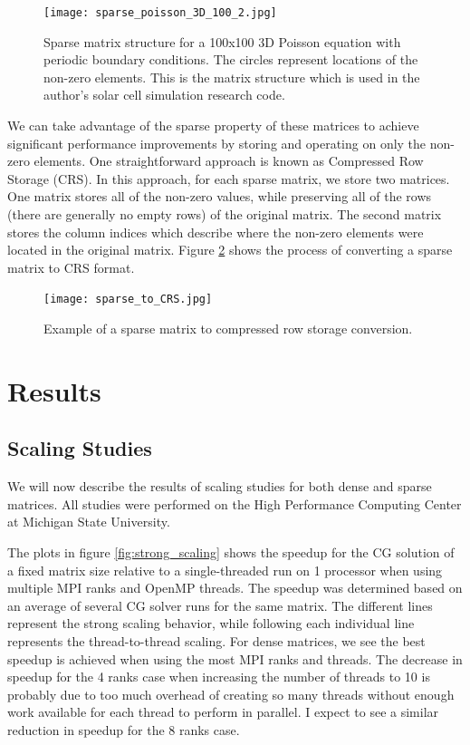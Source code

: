 \documentclass{article}
\begin{document}
\begin{figure}[H]
	\centering
	\texttt{[image: sparse\_poisson\_3D\_100\_2.jpg]}  
	
	\caption{Sparse matrix structure for a 100x100 3D Poisson equation with periodic boundary conditions. The circles represent locations of the non-zero elements. This is the matrix structure which is used in the author's solar cell simulation research code.}
	\label{fig:sparse_structure}
\end{figure}

We can take advantage of the sparse property of these matrices to achieve significant performance improvements by storing and operating on only the non-zero elements. One straightforward approach is known as Compressed Row Storage (CRS). In this approach, for each sparse matrix, we store two matrices. One matrix stores all of the non-zero values, while preserving all of the rows (there are generally no empty rows) of the original matrix. The second matrix stores the column indices which describe where the non-zero elements were located in the original matrix. Figure \ref{fig:sparse_to_crs} shows the process of converting a sparse matrix to CRS format.

\begin{figure}[H]
	\centering
    \texttt{[image: sparse\_to\_CRS.jpg]}  
	
	\caption{Example of a sparse matrix to compressed row storage conversion.}
	\label{fig:sparse_to_crs}
\end{figure}



\section{Results}
\subsection{Scaling Studies}
We will now describe the results of scaling studies for both dense and sparse matrices. All studies were performed on the High Performance Computing Center at Michigan State University. 

The plots in figure \ref{fig:strong_scaling} shows the speedup for the CG solution of a fixed matrix size relative to a single-threaded run on 1 processor when using multiple MPI ranks and OpenMP threads. The speedup was determined based on an average of several CG solver runs for the same matrix. The different lines represent the strong scaling behavior, while following each individual line represents the thread-to-thread scaling. For dense matrices, we see the best speedup is achieved when using the most MPI ranks and threads. The decrease in speedup for the 4 ranks case when increasing the number of threads to 10 is probably due to too much overhead of creating so many threads without enough work available for each thread to perform in parallel. I expect to see a similar reduction in speedup for the 8 ranks case. 
\end{document}
